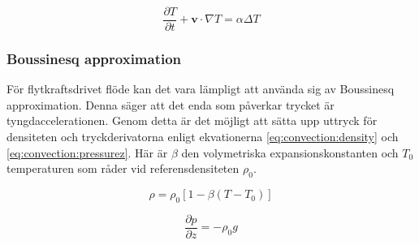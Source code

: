 \begin{equation}
\label{eq:convection:energy}
\frac{\partial T}{\partial t} + \mathbf{v}\cdot\nabla T = \alpha\Delta T
\end{equation}

\subsubsection{Boussinesq approximation}

För flytkraftsdrivet flöde kan det vara lämpligt att använda sig av
Boussinesq approximation. Denna säger att det enda som påverkar trycket är
tyngdaccelerationen. Genom detta är det möjligt att sätta upp uttryck för densiteten
och tryckderivatorna enligt ekvationerna \eqref{eq:convection:density}
och \eqref{eq:convection:pressurez}. Här är
$\beta$ den volymetriska expansionskonstanten och
$T_0$ temperaturen som råder vid referensdensiteten $\rho_0$.

\begin{equation}
\label{eq:convection:density}
\rho = \rho_0[1-\beta(T-T_0)]
\end{equation}

\begin{equation}
\label{eq:convection:pressurez}
\frac{\partial p}{\partial z} = -\rho_0g
\end{equation}


